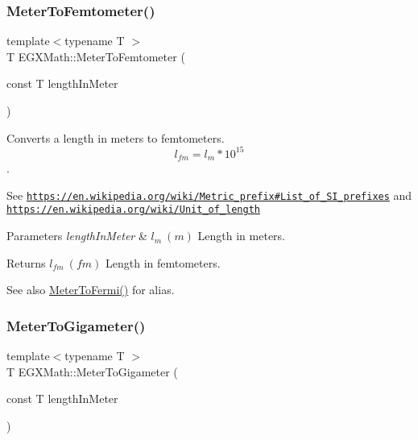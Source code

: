 \subsubsection{\texorpdfstring{Meter\+To\+Femtometer()}{MeterToFemtometer()}}
{\footnotesize\ttfamily template$<$typename T $>$ \\
T E\+G\+X\+Math\+::\+Meter\+To\+Femtometer (\begin{DoxyParamCaption}\item[{const T}]{length\+In\+Meter }\end{DoxyParamCaption})}



Converts a length in meters to femtometers. \[ l_{fm}=l_{m} * 10^{15} \]. 

See \href{https://en.wikipedia.org/wiki/Metric_prefix#List_of_SI_prefixes}{\tt https\+://en.\+wikipedia.\+org/wiki/\+Metric\+\_\+prefix\#\+List\+\_\+of\+\_\+\+S\+I\+\_\+prefixes} and \href{https://en.wikipedia.org/wiki/Unit_of_length}{\tt https\+://en.\+wikipedia.\+org/wiki/\+Unit\+\_\+of\+\_\+length} 
\begin{DoxyParams}{Parameters}
{\em length\+In\+Meter} & $ l_{m}\ (m)$ Length in meters. \\
\hline
\end{DoxyParams}
\begin{DoxyReturn}{Returns}
$ l_{fm}\ (fm)$ Length in femtometers. 
\end{DoxyReturn}
\begin{DoxySeeAlso}{See also}
\mbox{\hyperlink{group___e_g_x_math-_conversions-_length_conversions-_meter-_non-_s_i_ga2cf89a4a80da02e3e3c82e844095acfe}{Meter\+To\+Fermi()}} for alias. 
\end{DoxySeeAlso}
\mbox{\label{group___e_g_x_math-_conversions-_length_conversions-_meter-_s_i_ga045300d4eccd668680eab86f9262cc81}} 
\subsubsection{\texorpdfstring{Meter\+To\+Gigameter()}{MeterToGigameter()}}
{\footnotesize\ttfamily template$<$typename T $>$ \\
T E\+G\+X\+Math\+::\+Meter\+To\+Gigameter (\begin{DoxyParamCaption}\item[{const T}]{length\+In\+Meter }\end{DoxyParamCaption})}



